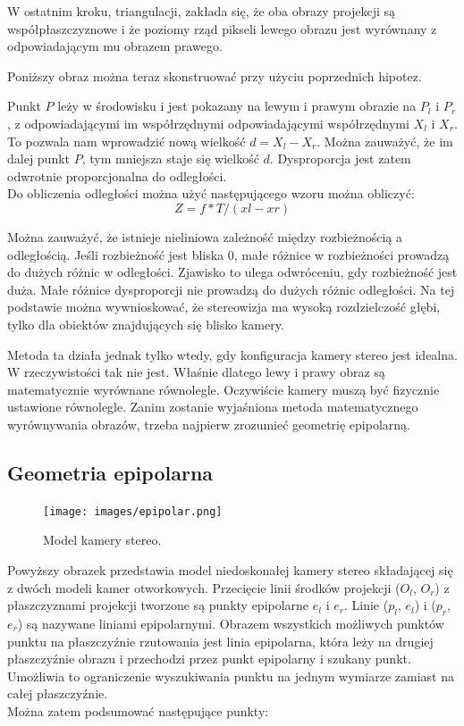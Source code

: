 \documentclass[magisterska]{pracadypl}
\begin{document}
W ostatnim kroku, triangulacji, zakłada się, że oba obrazy projekcji są współpłaszczyznowe i że poziomy rząd pikseli lewego obrazu jest wyrównany z odpowiadającym mu obrazem prawego.

Poniższy obraz można teraz skonstruować przy użyciu poprzednich hipotez.

Punkt $P$ leży w środowisku i jest pokazany na
lewym i prawym obrazie na $P_l$ i $P_r$, z odpowiadającymi im współrzędnymi
odpowiadającymi współrzędnymi $X_l$ i $X_r$. To pozwala nam wprowadzić nową wielkość $d = X_l - X_r$.
Można zauważyć, że im dalej punkt $P$, tym mniejsza staje się wielkość $d$. Dysproporcja jest zatem odwrotnie proporcjonalna do odległości.\\
Do obliczenia odległości można użyć następującego wzoru można obliczyć: \[Z=f*T/(xl-xr)\]

Można zauważyć, że istnieje nieliniowa zależność między rozbieżnością a odległością.
Jeśli rozbieżność jest bliska 0, małe różnice w rozbieżności prowadzą do dużych różnic w odległości.
Zjawisko to ulega odwróceniu, gdy rozbieżność jest duża. Małe różnice dysproporcji nie prowadzą do dużych różnic odległości. Na tej podstawie można wywnioskować, że stereowizja ma wysoką rozdzielczość głębi, tylko dla obiektów znajdujących się blisko kamery.

Metoda ta działa jednak tylko wtedy, gdy konfiguracja kamery stereo jest idealna. W
rzeczywistości tak nie jest. Właśnie dlatego lewy i prawy obraz są
matematycznie wyrównane równolegle. Oczywiście kamery muszą być fizycznie ustawione równolegle.
Zanim zostanie wyjaśniona metoda matematycznego wyrównywania obrazów, trzeba najpierw zrozumieć geometrię epipolarną.

\subsection{Geometria epipolarna}

\begin{figure}[H]  %
    \centering  %
    \texttt{[image: images/epipolar.png]}  %
    \captionsetup{font=footnotesize}
    \caption[Model kamery stereo. Learning OpenCV 3, O'Reilly, Str. 709]{Model kamery stereo.}
    \label{fig:rpi}  %
\end{figure}

Powyższy obrazek przedstawia model niedoskonałej kamery stereo składającej się z dwóch modeli kamer otworkowych.
Przecięcie linii środków projekcji ($O_l$, $O_r$) z płaszczyznami projekcji tworzone są punkty epipolarne $e_l$ i $e_r$. Linie ($p_l$, $e_l$) i ($p_r$, $e_r$) są nazywane liniami epipolarnymi. Obrazem wszystkich możliwych punktów punktu
na płaszczyźnie rzutowania jest linia epipolarna, która leży na drugiej płaszczyźnie obrazu i
przechodzi przez punkt epipolarny i szukany punkt. Umożliwia to ograniczenie wyszukiwania punktu na jednym wymiarze zamiast na całej płaszczyźnie.\\
Można zatem podsumować następujące punkty:
\end{document}
